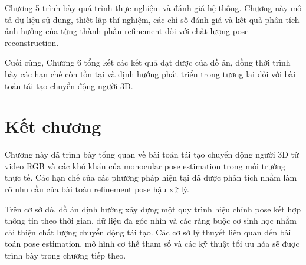 \documentclass[../DoAn.tex]{subfiles}
\begin{document}
Chương 5 trình bày quá trình thực nghiệm và đánh giá hệ thống. Chương này mô tả dữ liệu sử dụng, thiết lập thí nghiệm, các chỉ số đánh giá và kết quả phân tích ảnh hưởng của từng thành phần refinement đối với chất lượng pose reconstruction.

Cuối cùng, Chương 6 tổng kết các kết quả đạt được của đồ án, đồng thời trình bày các hạn chế còn tồn tại và định hướng phát triển trong tương lai đối với bài toán tái tạo chuyển động người 3D.

\section*{Kết chương}

Chương này đã trình bày tổng quan về bài toán tái tạo chuyển động người 3D từ video RGB và các khó khăn của monocular pose estimation trong môi trường thực tế. Các hạn chế của các phương pháp hiện tại đã được phân tích nhằm làm rõ nhu cầu của bài toán refinement pose hậu xử lý.

Trên cơ sở đó, đồ án định hướng xây dựng một quy trình hiệu chỉnh pose kết hợp thông tin theo thời gian, dữ liệu đa góc nhìn và các ràng buộc cơ sinh học nhằm cải thiện chất lượng chuyển động tái tạo. Các cơ sở lý thuyết liên quan đến bài toán pose estimation, mô hình cơ thể tham số và các kỹ thuật tối ưu hóa sẽ được trình bày trong chương tiếp theo.
\end{document}
